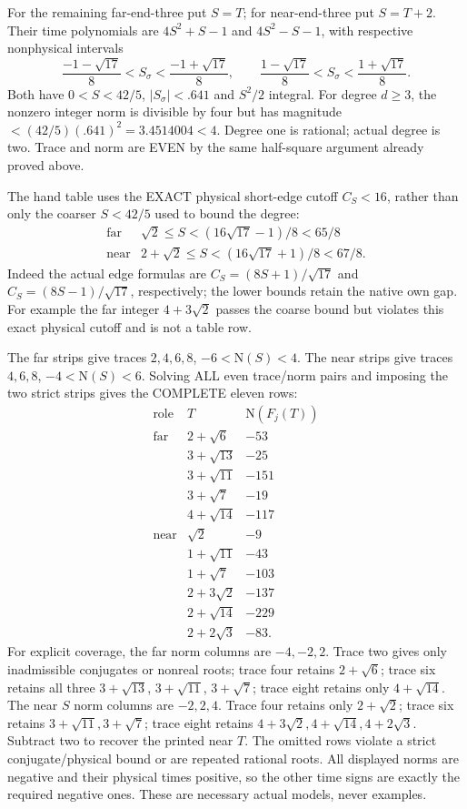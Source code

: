 \documentclass[11pt]{article}
\begin{document}
For the remaining far-end-three put \(S=T\);
for near-end-three put \(S=T+2\).
Their time polynomials are \(4S^2+S-1\) and
\(4S^2-S-1\), with respective nonphysical intervals
\[
 {\frac{-1-\sqrt{17}}{8}}<S_\sigma<{\frac{-1+\sqrt{17}}{8}},
 \qquad
 {\frac{1-\sqrt{17}}{8}}<S_\sigma<{\frac{1+\sqrt{17}}{8}}.
\]
Both have \(0<S<42/5\), \(|S_\sigma|<.641\)
and \(S^2/2\) integral.
For degree \(d\ge3\), the nonzero integer norm
is divisible by four but has magnitude
\(<(42/5)(.641)^2=3.4514004<4\).
Degree one is rational; actual degree is two.
Trace and norm are EVEN by the same half-square
argument already proved above.

The hand table uses the EXACT physical short-edge
cutoff \(C_S<16\), rather than only the coarser
\(S<42/5\) used to bound the degree:
\[
\begin{array}{c|c}
 \text{far}&\sqrt2\le S<(16\sqrt{17}-1)/8<65/8\\
 \text{near}&2+\sqrt2\le S<(16\sqrt{17}+1)/8<67/8 .
\end{array}
\]
Indeed the actual edge formulas are
\(C_S=(8S+1)/\sqrt{17}\) and
\(C_S=(8S-1)/\sqrt{17}\), respectively;
the lower bounds retain the native own gap.
For example the far integer \(4+3\sqrt2\)
passes the coarse bound but violates this
exact physical cutoff and is not a table row.

The far strips give traces \(2,4,6,8\),
\(-6<\mathrm N(S)<4\).
The near strips give traces \(4,6,8\),
\(-4<\mathrm N(S)<6\).
Solving ALL even trace/norm pairs and imposing
the two strict strips gives the COMPLETE eleven rows:
\[
\begin{array}{c|c|r}
 \text{role}&T&\mathrm N(F_j(T))\\ \hline
 \text{far}&2+\sqrt6&-53\\
 &3+\sqrt{13}&-25\\
 &3+\sqrt{11}&-151\\
 &3+\sqrt7&-19\\
 &4+\sqrt{14}&-117\\ \hline
 \text{near}&\sqrt2&-9\\
 &1+\sqrt{11}&-43\\
 &1+\sqrt7&-103\\
 &2+3\sqrt2&-137\\
 &2+\sqrt{14}&-229\\
 &2+2\sqrt3&-83 .
\end{array}
\]
For explicit coverage, the far norm columns are
\(-4,-2,2\).
Trace two gives only inadmissible conjugates or
nonreal roots; trace four retains \(2+\sqrt6\);
trace six retains all three \(3+\sqrt{13}\),
\(3+\sqrt{11}\), \(3+\sqrt7\);
trace eight retains only \(4+\sqrt{14}\).
The near \(S\) norm columns are \(-2,2,4\).
Trace four retains only \(2+\sqrt2\);
trace six retains \(3+\sqrt{11},3+\sqrt7\);
trace eight retains \(4+3\sqrt2,4+\sqrt{14},4+2\sqrt3\).
Subtract two to recover the printed near \(T\).
The omitted rows violate a strict conjugate/physical
bound or are repeated rational roots.
All displayed norms are negative and their physical
times positive, so the other time signs are exactly
the required negative ones.
These are necessary actual models, never examples.
\end{document}
